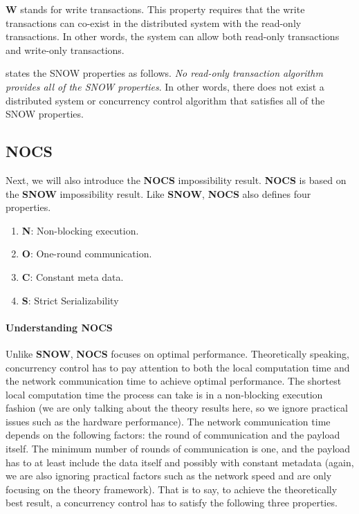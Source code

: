 \textbf{W} stands for write transactions. This property requires that the write transactions can co-exist in the distributed system with the read-only transactions. In other words, the system can allow both read-only transactions and write-only transactions.

\cite{lu2016snow} states the SNOW properties as follows.
\textit{No read-only transaction algorithm provides all of the SNOW properties}. In other words, there does not exist a distributed system or concurrency control algorithm that satisfies all of the SNOW properties.


\subsection{NOCS}
Next, we will also introduce the \textbf{NOCS} impossibility result. \textbf{NOCS} is based on the \textbf{SNOW} impossibility result. Like \textbf{SNOW}, \textbf{NOCS} also defines four properties.

\begin{enumerate}
    \item \textbf{N}: Non-blocking execution.
    \item \textbf{O}: One-round communication.
    \item \textbf{C}: Constant meta data.
    \item \textbf{S}: Strict Serializability
\end{enumerate}

\paragraph{Understanding NOCS}
Unlike \textbf{SNOW}, \textbf{NOCS} focuses on optimal performance. Theoretically speaking, concurrency control has to pay attention to both the local computation time and the network communication time to achieve optimal performance. The shortest local computation time the process can take is in a non-blocking execution fashion (we are only talking about the theory results here, so we ignore practical issues such as the hardware performance). The network communication time depends on the following factors: the round of communication and the payload itself. The minimum number of rounds of communication is one, and the payload has to at least include the data itself and possibly with constant metadata (again, we are also ignoring practical factors such as the network speed and are only focusing on the theory framework). That is to say, to achieve the theoretically best result, a concurrency control has to satisfy the following three properties.

